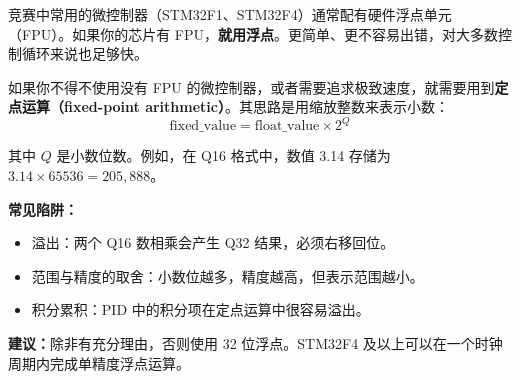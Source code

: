 竞赛中常用的微控制器（STM32F1、STM32F4）通常配有硬件浮点单元（FPU）。如果你的芯片有 FPU，\textbf{就用浮点}。更简单、更不容易出错，对大多数控制循环来说也足够快。

如果你不得不使用没有 FPU 的微控制器，或者需要追求极致速度，就需要用到\textbf{定点运算（fixed-point arithmetic）}。其思路是用缩放整数来表示小数：
\begin{equation}
\text{fixed\_value} = \text{float\_value} \times 2^Q
\end{equation}

其中 $Q$ 是小数位数。例如，在 Q16 格式中，数值 3.14 存储为 $3.14 \times 65536 = 205{,}888$。

\textbf{常见陷阱：}
\begin{itemize}
    \item 溢出：两个 Q16 数相乘会产生 Q32 结果，必须右移回位。
    \item 范围与精度的取舍：小数位越多，精度越高，但表示范围越小。
    \item 积分累积：PID 中的积分项在定点运算中很容易溢出。
\end{itemize}

\textbf{建议：}除非有充分理由，否则使用 32 位浮点。STM32F4 及以上可以在一个时钟周期内完成单精度浮点运算。

